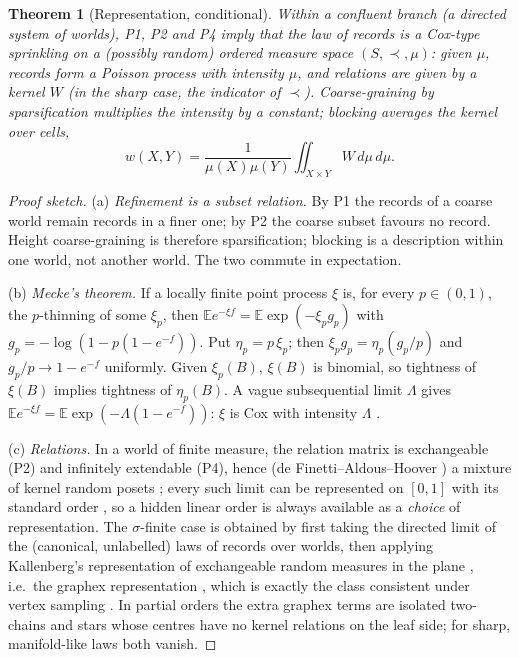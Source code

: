 \documentclass[11pt]{article}
\newtheorem{theorem}{Theorem}
\theoremstyle{definition}
\theoremstyle{remark}
\newcommand{\E}{\mathbb{E}}
\begin{document}
\begin{theorem}[Representation, conditional]\label{thm:rep}
Within a confluent branch (a directed system of worlds), P1, P2 and P4 imply that the law of records is a Cox-type sprinkling on a (possibly random) ordered measure space $(S,\prec,\mu)$: given $\mu$, records form a Poisson process with intensity $\mu$, and relations are given by a kernel $W$ (in the sharp case, the indicator of $\prec$). Coarse-graining by sparsification multiplies the intensity by a constant; blocking averages the kernel over cells,
\[
w(X,Y)=\frac{1}{\mu(X)\mu(Y)}\iint_{X\times Y} W\,d\mu\,d\mu .
\]
\end{theorem}

\begin{proof}[Proof sketch]
(a) \emph{Refinement is a subset relation.} By P1 the records of a coarse world remain records in a finer one; by P2 the coarse subset favours no record. Height coarse-graining is therefore sparsification; blocking is a description within one world, not another world. The two commute in expectation.

(b) \emph{Mecke's theorem.} If a locally finite point process $\xi$ is, for every $p\in(0,1)$, the $p$-thinning of some $\xi_p$, then $\E e^{-\xi f}=\E\exp(-\xi_p g_p)$ with $g_p=-\log(1-p(1-e^{-f}))$. Put $\eta_p=p\,\xi_p$; then $\xi_p g_p=\eta_p(g_p/p)$ and $g_p/p\to 1-e^{-f}$ uniformly. Given $\xi_p(B)$, $\xi(B)$ is binomial, so tightness of $\xi(B)$ implies tightness of $\eta_p(B)$. A vague subsequential limit $\Lambda$ gives $\E e^{-\xi f}=\E\exp(-\Lambda(1-e^{-f}))$: $\xi$ is Cox with intensity $\Lambda$ \cite{mecke,kallenbergRM}.

(c) \emph{Relations.} In a world of finite measure, the relation matrix is exchangeable (P2) and infinitely extendable (P4), hence (de Finetti--Aldous--Hoover \cite{aldous,hoover}) a mixture of kernel random posets \cite{janson}; every such limit can be represented on $[0,1]$ with its standard order \cite{hladky}, so a hidden linear order is always available as a \emph{choice} of representation. The $\sigma$-finite case is obtained by first taking the directed limit of the (canonical, unlabelled) laws of records over worlds, then applying Kallenberg's representation of exchangeable random measures in the plane \cite{kallenberg90}, i.e.\ the graphex representation \cite{veitchroy,borgs}, which is exactly the class consistent under vertex sampling \cite{veitchroy19}. In partial orders the extra graphex terms are isolated two-chains and stars whose centres have no kernel relations on the leaf side; for sharp, manifold-like laws both vanish.
\end{proof}
\end{document}
